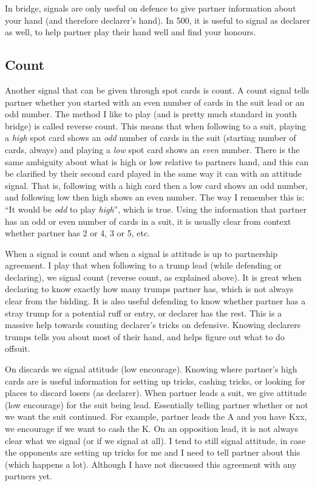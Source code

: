 \documentclass[a4paper]{JoshCards}
\begin{document}
In bridge, signals are only useful on defence to give partner information about your hand (and therefore declarer's hand). In 500, it is useful to signal as declarer as well, to help partner play their hand well and find your honours.

\subsection*{Count}

Another signal that can be given through spot cards is count. A count signal tells partner whether you started with an even number of cards in the suit lead or an odd number. The method I like to play (and is pretty much standard in youth bridge) is called reverse count. This means that when following to a suit, playing a \textit{high} spot card shows an \textit{odd} number of cards in the suit (starting number of cards, always) and playing a \textit{low} spot card shows an \textit{even} number. There is the same ambiguity about what is high or low relative to partners hand, and this can be clarified by their second card played in the same way it can with an attitude signal. That is, following with a high card then a low card shows an odd number, and following low then high shows an even number. The way I remember this is: ``It would be \textit{odd} to play \textit{high}'', which is true. Using the information that partner has an odd or even number of cards in a suit, it is usually clear from context whether partner has 2 or 4, 3 or 5, etc.


When a signal is count and when a signal is attitude is up to partnership agreement. I play that when following to a trump lead (while defending or declaring), we signal count (reverse count, as explained above). It is great when declaring to know exactly how many trumps partner has, which is not always clear from the bidding. It is also useful defending to know whether partner has a stray trump for a potential ruff or entry, or declarer has the rest. This is a massive help towards counting declarer's tricks on defensive. Knowing declarers trumps tells you about most of their hand, and helps figure out what to do offsuit.

On discards we signal attitude (low encourage). Knowing where partner's high cards are is useful information for setting up tricks, cashing tricks, or looking for places to discard losers (as declarer). When partner leads a suit, we give attitude (low encourage) for the suit being lead. Essentially telling partner whether or not we want the suit continued. For example, partner leads the A and you have Kxx, we encourage if we want to cash the K. On an opposition lead, it is not always clear what we signal (or if we signal at all). I tend to still signal attitude, in case the opponents are setting up tricks for me and I need to tell partner about this (which happens a lot). Although I have not discussed this agreement with any partners yet.
\end{document}
